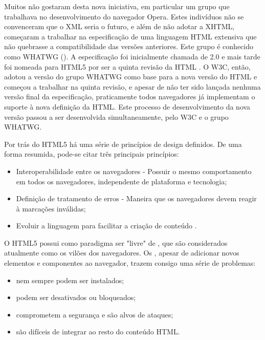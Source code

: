 \documentclass[espaco=simples,appendix=Name]{abnt}
\begin{document}
Muitos não gostaram desta nova iniciativa, em particular um grupo que trabalhava no desenvolvimento do navegador Opera. Estes indivíduos não se convenceram que o XML seria o futuro, e além de não adotar a XHTML, começaram a trabalhar na especificação de uma linguagem HTML extensiva que não quebrasse a compatibilidade das versões anteriores. Este grupo é conhecido como WHATWG (). A especificação foi inicialmente chamada de  2.0 e mais tarde foi nomeada para HTML5 por ser a quinta revisão da HTML \cite{HTML5Intro}. O W3C, então, adotou a versão do grupo WHATWG como base para a nova versão do HTML e começou a trabalhar na quinta revisão, e apesar de não ter sido lançada nenhuma versão final da especificação, praticamente todos navegadores já implementam o suporte à nova definição da HTML. Este processo de desenvolvimento da nova versão passou a ser desenvolvida simultaneamente, pelo W3C e o grupo WHATWG.

Por trás do HTML5 há uma série de princípios de design definidos. De uma forma resumida, pode-se citar três principais princípios\cite{HTML5Intro}:
\begin{itemize}
		\item Interoperabilidade entre os navegadores - Possuir o mesmo comportamento em todos os navegadores, independente de plataforma e tecnologia;
		\item Definição de tratamento de erros - Maneira que os navegadores devem reagir à marcações inválidas;
		\item Evoluir a linguagem para facilitar a criação de conteúdo .
\end{itemize}

O HTML5 possui como paradigma ser "livre" de , que são considerados atualmente como os vilões dos navegadores. Os , apesar de adicionar novos elementos e componentes ao navegador, trazem consigo uma série de problemas:

\begin{itemize}
		\item {} nem sempre podem ser instalados;
		\item {} podem ser desativados ou bloqueados;
		\item {} comprometem a segurança e são alvos de ataques;
		\item {} são difíceis de integrar ao resto do conteúdo HTML.
\end{itemize}
\end{document}
